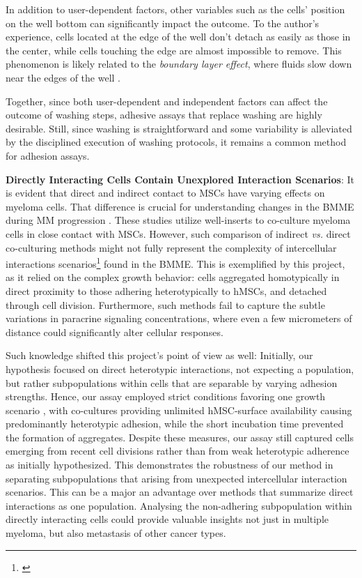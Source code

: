 In addition to user-dependent factors, other variables such as the cells'
position on the well bottom can significantly impact the outcome. To the
author's experience, cells located at the edge of the well don't detach as
easily as those in the center, while cells touching the edge are almost
impossible to remove. This phenomenon is likely related to the \textit{boundary
      layer effect}, where fluids slow down near the edges of the well
\cite{weyburneNewThicknessShape2014}.

Together, since both user-dependent and independent factors can affect the
outcome of washing steps, adhesive assays that replace washing are highly
desirable. Still, since washing is straightforward and some variability is
alleviated by the disciplined execution of washing protocols, it remains a
common method for adhesion assays.



\textbf{Directly Interacting Cells Contain Unexplored Interaction Scenarios}: It
is evident that direct and indirect contact to \acp{MSC} have varying effects on
myeloma cells. That difference is crucial for understanding changes in the
\ac{BMME} during MM progression \cite{fairfieldMultipleMyelomaCells2020,
      dziadowiczBoneMarrowStromaInduced2022}. These studies utilize well-inserts to
co-culture myeloma cells in close  contact with MSCs. However,
such comparison of indirect \textit{vs.} direct co-culturing methods might not
fully represent the complexity of intercellular interactions
scenarios\footnote{\footinteractionscenario\label{foot:interactionscenario}}
found in the \ac{BMME}. This is exemplified by this project, as it relied on the
complex growth behavior: \INA cells aggregated homotypically in direct proximity
to those adhering heterotypically to \acp{hMSC}, and detached through cell
division. Furthermore, such methods fail to capture the subtle variations in
paracrine signaling concentrations, where even a few micrometers of distance
could significantly alter cellular responses.

Such knowledge shifted this project's point of view as well: Initially, our
hypothesis focused on direct heterotypic interactions, not expecting a \nMAina
population, but rather subpopulations within \MAina cells that are separable by
varying adhesion strengths. Hence, our assay employed strict conditions favoring
one growth scenario , with co-cultures
providing unlimited hMSC-surface availability causing predominantly heterotypic
adhesion, while the short incubation time prevented the formation of aggregates.
Despite these measures, our assay still captured cells emerging from recent cell
divisions rather than from weak heterotypic adherence as initially hypothesized.
This demonstrates the robustness of our method in separating subpopulations that
arising from unexpected intercellular interaction scenarios. This can be a major
an advantage over methods that summarize direct interactions as one population.
Analysing the non-adhering subpopulation within directly interacting cells could
provide valuable insights not just in multiple myeloma, but also metastasis of
other cancer types.


